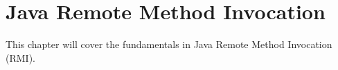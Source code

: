 \documentclass[Main]{subfiles}
\begin{document}
\chapter{Java Remote Method Invocation}
This chapter will cover the fundamentals in Java Remote Method Invocation (RMI).
\end{document}
